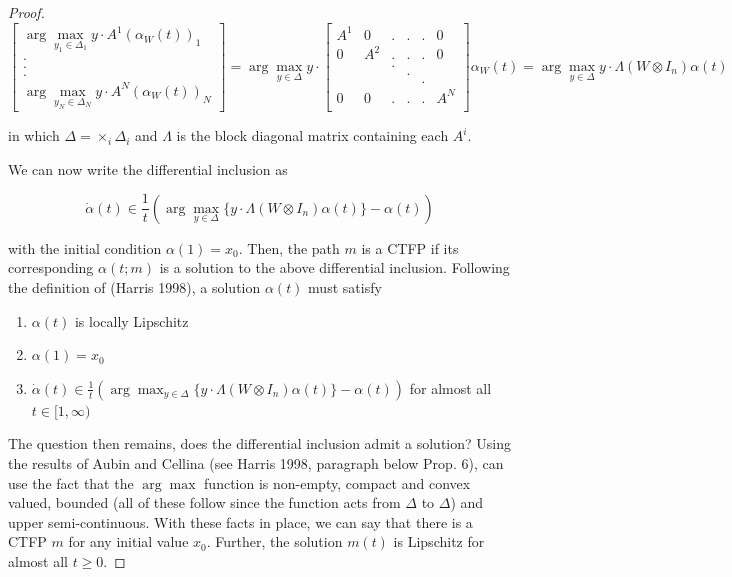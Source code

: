 \documentclass{article}
\theoremstyle{definition}
\begin{document}
\begin{proof}
    \begin{equation}
      \begin{bmatrix}
        \arg\max_{y_1 \in \Delta_1} y \cdot A^1 ( \alpha_W(t))_1 \\
        .\\
        .\\
        .\\
        \arg \max_{y_N \in \Delta_N} y \cdot A^N (\alpha_W(t))_N 
      \end{bmatrix} = 
      \arg \max_{y \in \Delta} y \cdot \begin{bmatrix}
        A^1 & 0 & . & . & . & 0 \\
        0 & A^2 & . & . & . & 0 \\
        & & . & & & \\
        & & & . & & \\
        & & & & . & \\
        0 & 0 & . & . & . & A^N \\
      \end{bmatrix} \alpha_W(t) = \arg\max_{y \in \Delta} y \cdot \Lambda (W \otimes I_n)
      \alpha(t)
    \end{equation}

    in which $\Delta = \times_i \Delta_i$ and $\Lambda$ is the block diagonal matrix containing
    each $A^i$. 

    We can now write the differential inclusion as

    \begin{equation}
      \dot{\alpha}(t) \in \frac{1}{t} (\arg \max_{y \in \Delta}  \{y \cdot \Lambda (W \otimes
      I_n)
      \alpha(t) \}- \alpha(t))
    \end{equation}

    with the initial condition $\alpha(1) = x_0$. Then, the path $m$ is a CTFP if its
    corresponding $\alpha(t; m)$ is a solution to the above differential inclusion. Following
    the definition of (Harris 1998), a solution $\alpha(t)$ must satisfy

    \begin{enumerate}
      \item $\alpha(t)$ is locally Lipschitz
      \item $\alpha(1) = x_0$
      \item $\dot{\alpha}(t) \in \frac{1}{t} (\arg \max_{y \in \Delta}  \{y \cdot \Lambda (W \otimes
      I_n)
      \alpha(t) \}- \alpha(t))$ for almost all $t \in [1, \infty)$ 
    \end{enumerate}

    The question then remains, does the differential inclusion admit a solution? Using the
    results of Aubin and Cellina (see Harris 1998, paragraph below Prop. 6), can use the fact
    that the $\arg \max$ function is non-empty, compact and convex valued, bounded (all of
    these follow since the function acts from $\Delta$ to $\Delta$) and upper semi-continuous. 
    With these facts in place, we can say that there is a CTFP $m$ for any initial value $x_0$. Further, the solution $m(t)$ is Lipschitz for almost all $t \geq 0$.

  \end{proof}
\end{document}
